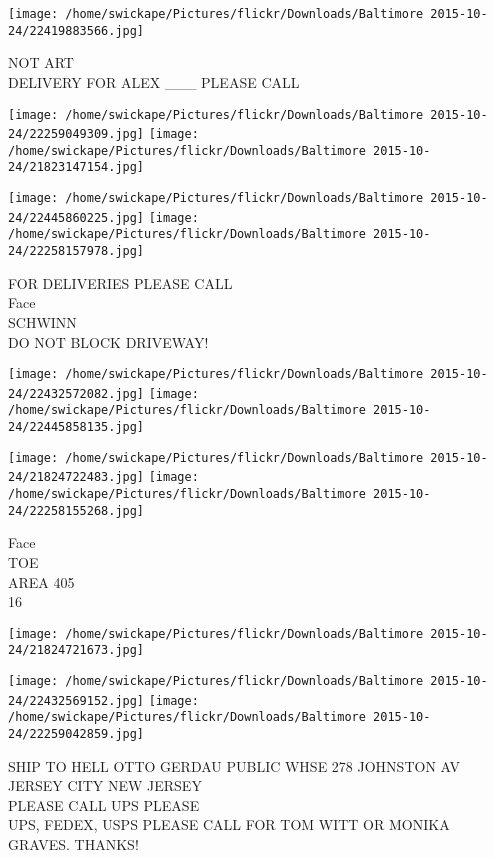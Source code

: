 \documentclass[10pt,letterpaper]{article}
\begin{document}
\vspace{0.25in}
\texttt{[image: /home/swickape/Pictures/flickr/Downloads/Baltimore 2015-10-24/22419883566.jpg]}

NOT ART\\
DELIVERY FOR ALEX \_\_\_ PLEASE CALL
\pagebreak

\texttt{[image: /home/swickape/Pictures/flickr/Downloads/Baltimore 2015-10-24/22259049309.jpg]}
\texttt{[image: /home/swickape/Pictures/flickr/Downloads/Baltimore 2015-10-24/21823147154.jpg]}

\texttt{[image: /home/swickape/Pictures/flickr/Downloads/Baltimore 2015-10-24/22445860225.jpg]}
\texttt{[image: /home/swickape/Pictures/flickr/Downloads/Baltimore 2015-10-24/22258157978.jpg]}

FOR DELIVERIES PLEASE CALL\\
Face\\
SCHWINN\\
DO NOT BLOCK DRIVEWAY!
\pagebreak

\texttt{[image: /home/swickape/Pictures/flickr/Downloads/Baltimore 2015-10-24/22432572082.jpg]}
\texttt{[image: /home/swickape/Pictures/flickr/Downloads/Baltimore 2015-10-24/22445858135.jpg]}

\texttt{[image: /home/swickape/Pictures/flickr/Downloads/Baltimore 2015-10-24/21824722483.jpg]}
\texttt{[image: /home/swickape/Pictures/flickr/Downloads/Baltimore 2015-10-24/22258155268.jpg]}

Face\\
TOE\\
AREA 405\\
16
\pagebreak

\texttt{[image: /home/swickape/Pictures/flickr/Downloads/Baltimore 2015-10-24/21824721673.jpg]}

\vspace{0.25in}
\texttt{[image: /home/swickape/Pictures/flickr/Downloads/Baltimore 2015-10-24/22432569152.jpg]}
\texttt{[image: /home/swickape/Pictures/flickr/Downloads/Baltimore 2015-10-24/22259042859.jpg]}

SHIP TO HELL OTTO GERDAU PUBLIC WHSE 278 JOHNSTON AV JERSEY CITY NEW JERSEY\\
PLEASE CALL UPS PLEASE\\
UPS, FEDEX, USPS PLEASE CALL FOR TOM WITT OR MONIKA GRAVES.  THANKS!
\pagebreak
\end{document}
